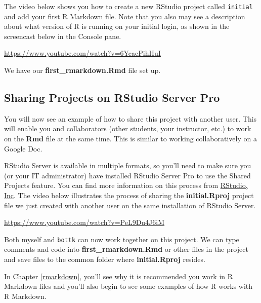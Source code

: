 \documentclass[]{tufte-book}
\begin{document}
The video below shows you how to create a new RStudio project called \texttt{initial} and add your first R Markdown file. Note that you also may see a description about what version of R is running on your initial login, as shown in the screencast below in the Console pane.

\vspace{0.1in}\begin{center}\footnotesize{\url{https://www.youtube.com/watch?v=6YcacPihHuI}}\end{center}\vspace{0.1in}

We have our \textbf{first\_rmarkdown.Rmd} file set up.

\subsection{Sharing Projects on RStudio Server Pro}\label{sharing-projects-on-rstudio-server-pro}

You will now see an example of how to share this project with another user. This will enable you and collaborators (other students, your instructor, etc.) to work on the \textbf{Rmd} file at the same time. This is similar to working collaboratively on a Google Doc.

RStudio Server is available in multiple formats, so you'll need to make sure you (or your IT administrator) have installed RStudio Server Pro to use the Shared Projects feature. You can find more information on this process from \href{https://support.rstudio.com/hc/en-us/articles/211659737-Sharing-Projects-in-RStudio-Server-Pro}{RStudio, Inc}. The video below illustrates the process of sharing the \textbf{initial.Rproj} project file we just created with another user on the same installation of RStudio Server.

\vspace{0.1in}\begin{center}\footnotesize{\url{https://www.youtube.com/watch?v=PeL9Du4J6iM}}\end{center}\vspace{0.1in}

Both myself and \texttt{bottk} can now work together on this project. We can type comments and code into \textbf{first\_rmarkdown.Rmd} or other files in the project and save files to the common folder where \textbf{initial.Rproj} resides.

In Chapter \ref{rmarkdown}, you'll see why it is recommended you work in R Markdown files and you'll also begin to see some examples of how R works with R Markdown.
\end{document}
